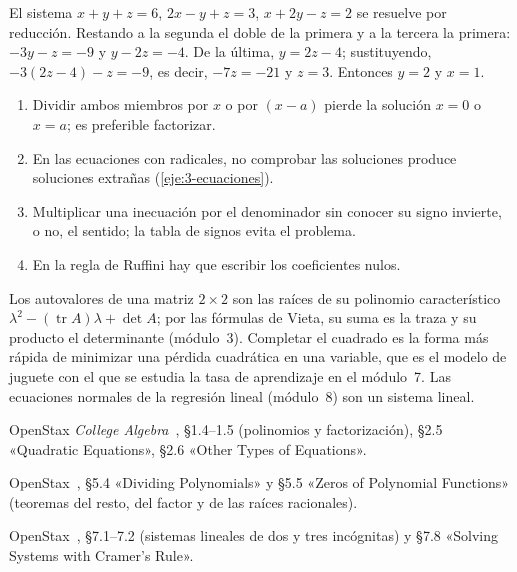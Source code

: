 \begin{ejemplo}\label{ej:gauss3}
El sistema $x+y+z=6$, $2x-y+z=3$, $x+2y-z=2$ se resuelve por reducción. Restando a la segunda el doble de la primera y a la tercera la primera: $-3y-z=-9$ y $y-2z=-4$. De la última, $y=2z-4$; sustituyendo, $-3(2z-4)-z=-9$, es decir, $-7z=-21$ y $z=3$. Entonces $y=2$ y $x=1$.
\end{ejemplo}

\begin{observacion}
\begin{enumerate}[label=(\alph*)]
\item Dividir ambos miembros por $x$ o por $(x-a)$ pierde la solución $x=0$ o $x=a$; es preferible factorizar.
\item En las ecuaciones con radicales, no comprobar las soluciones produce soluciones extrañas (\cref{eje:3-ecuaciones}).
\item Multiplicar una inecuación por el denominador sin conocer su signo invierte, o no, el sentido; la tabla de signos evita el problema.
\item En la regla de Ruffini hay que escribir los coeficientes nulos.
\end{enumerate}
\end{observacion}

\begin{observacion}
Los autovalores de una matriz $2\times2$ son las raíces de su polinomio característico $\lambda^2-(\operatorname{tr}A)\lambda+\det A$; por las fórmulas de Vieta, su suma es la traza y su producto el determinante (módulo~3). Completar el cuadrado es la forma más rápida de minimizar una pérdida cuadrática en una variable, que es el modelo de juguete con el que se estudia la tasa de aprendizaje en el módulo~7. Las ecuaciones normales de la regresión lineal (módulo~8) son un sistema lineal.
\end{observacion}

\begin{lecturas}
\item OpenStax \emph{College Algebra}~\cite{openstax}, §1.4--1.5 (polinomios y factorización), §2.5 «Quadratic Equations», §2.6 «Other Types of Equations».
\item OpenStax~\cite{openstax}, §5.4 «Dividing Polynomials» y §5.5 «Zeros of Polynomial Functions» (teoremas del resto, del factor y de las raíces racionales).
\item OpenStax~\cite{openstax}, §7.1--7.2 (sistemas lineales de dos y tres incógnitas) y §7.8 «Solving Systems with Cramer's Rule».
\end{lecturas}

